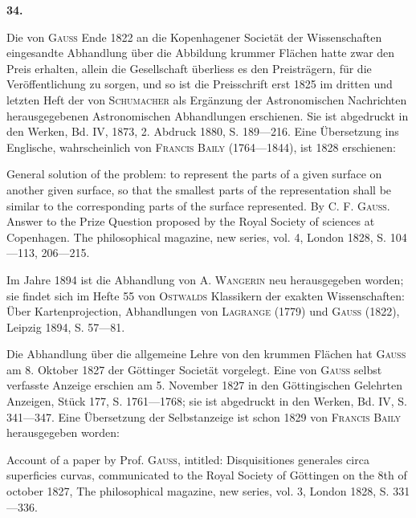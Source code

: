 \clearpage\begingroup{}
\begin{center}\textbf{34.}\par\smallskip
{}\end{center}
\begingroup\small
\noindent\hspace*{\parindent}Die von \textsc{Gauss} Ende 1822 an die Kopenhagener Societät der Wissenschaften eingesandte Abhandlung
über die Abbildung krummer Flächen hatte zwar den Preis erhalten, allein die Gesellschaft überliess es
den Preisträgern, für die Veröffentlichung zu sorgen, und so ist die Preisschrift erst 1825 im dritten und
letzten Heft der von \textsc{Schumacher} als Ergänzung der Astronomischen Nachrichten herausgegebenen Astronomischen
Abhandlungen erschienen. Sie ist abgedruckt in den Werken, Bd. IV, 1873, 2. Abdruck 1880,
S. 189—216. Eine Übersetzung ins Englische, wahrscheinlich von \textsc{Francis Baily} (1764—1844), ist 1828
erschienen:
\par
General solution of the problem: to represent the parts of a given surface on another given surface,
so that the smallest parts of the representation shall be similar to the corresponding parts of the surface
represented. By \textsc{C. F. Gauss}. Answer to the Prize Question proposed by the Royal Society of sciences
at Copenhagen. The philosophical magazine, new series, vol. 4, London 1828, S. 104—113, 206—215.
\par
Im Jahre 1894 ist die Abhandlung von \textsc{A. Wangerin} neu herausgegeben worden; sie findet sich im
Hefte 55 von \textsc{Ostwalds} Klassikern der exakten Wissenschaften: Über Kartenprojection, Abhandlungen von
\textsc{Lagrange} (1779) und \textsc{Gauss} (1822), Leipzig 1894, S. 57—81.
\par
Die Abhandlung über die allgemeine Lehre von den krummen Flächen hat \textsc{Gauss} am 8. Oktober
1827 der Göttinger Societät vorgelegt. Eine von \textsc{Gauss} selbst verfasste Anzeige erschien am 5. November
1827 in den Göttingischen Gelehrten Anzeigen, Stück 177, S. 1761—1768; sie ist abgedruckt in den Werken,
Bd. IV, S. 341—347. Eine Übersetzung der Selbstanzeige ist schon 1829 von \textsc{Francis Baily} herausgegeben
worden:
\par
Account of a paper by Prof. \textsc{Gauss}, intitled: Disquisitiones generales circa superficies curvas, communicated
to the Royal Society of Göttingen on the 8th of october 1827, The philosophical magazine, new
series, vol. 3, London 1828, S. 331—336.
